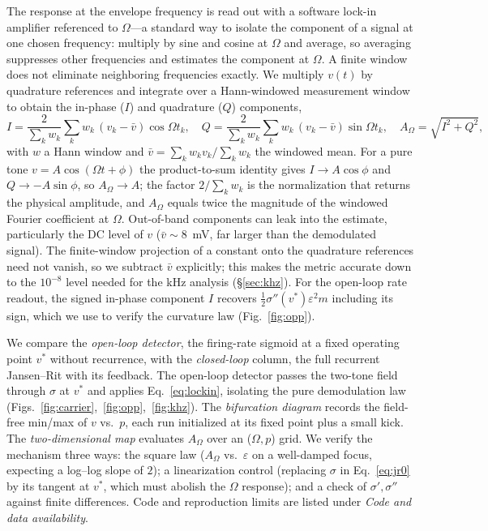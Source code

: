 \documentclass[11pt,a4paper]{article}
\newcommand{\Sig}{\sigma}
\newcommand{\half}{\tfrac{1}{2}}
\begin{document}
The response at the envelope frequency is read out with a software lock-in
amplifier referenced to $\Omega$---a standard way to isolate the component of a signal
at one chosen frequency: multiply by sine and cosine at $\Omega$ and average, so averaging suppresses other frequencies and estimates the component at
$\Omega$. A finite window does not eliminate neighboring frequencies exactly. We multiply $v(t)$ by quadrature references and
integrate over a Hann-windowed measurement window to obtain the in-phase ($I$) and
quadrature ($Q$) components,
\begin{equation}
I=\frac{2}{\sum_k w_k}\sum_k w_k\,(v_k-\bar v)\cos\Omega t_k,\quad
Q=\frac{2}{\sum_k w_k}\sum_k w_k\,(v_k-\bar v)\sin\Omega t_k,\quad
A_\Omega=\sqrt{I^2+Q^2},
\label{eq:lockin}
\end{equation}
with $w$ a Hann window and $\bar v=\sum_k w_k v_k/\sum_k w_k$ the windowed mean.
For a pure tone $v=A\cos(\Omega t+\phi)$ the product-to-sum identity gives
$I\to A\cos\phi$ and $Q\to -A\sin\phi$, so $A_\Omega\to A$; the factor
$2/\sum_k w_k$ is the normalization that returns the physical amplitude, and
$A_\Omega$ equals twice the magnitude of the windowed Fourier coefficient at
$\Omega$. Out-of-band components can leak into the estimate, particularly the DC level of $v$ ($\bar v\!\sim\!8$~mV, far
larger than the demodulated signal). The finite-window projection of a constant onto the quadrature references
need not vanish, so we subtract $\bar v$ explicitly; this makes the metric
accurate down to the $10^{-8}$ level needed for the kHz
analysis (\S\ref{sec:khz}). For the open-loop rate readout, the signed
in-phase component $I$ recovers
$\half\Sig''(v^*)\varepsilon^2 m$ including its sign, which we use to verify the
curvature law (Fig.~\ref{fig:opp}).

We compare the \emph{open-loop detector}, the firing-rate sigmoid at a fixed
operating point $v^*$ without recurrence, with the \emph{closed-loop} column, the full recurrent
Jansen--Rit with its feedback. The open-loop detector passes the two-tone field through
$\Sig$ at $v^*$ and applies Eq.~\eqref{eq:lockin}, isolating the pure demodulation law
(Figs.~\ref{fig:carrier},~\ref{fig:opp},~\ref{fig:khz}). The \emph{bifurcation
diagram} records the field-free min/max of $v$ vs.\ $p$, each run initialized at
its fixed point plus a small kick. The \emph{two-dimensional map} evaluates
$A_\Omega$ over an ($\Omega,p$) grid. We verify the mechanism three ways: the
square law ($A_\Omega$ vs.\ $\varepsilon$ on a well-damped focus, expecting a
log--log slope of $2$); a linearization control (replacing $\Sig$ in
Eq.~\eqref{eq:jr0} by its tangent at $v^*$, which must abolish the $\Omega$
response); and a check of $\Sig',\Sig''$ against finite differences. Code and reproduction limits are listed under \emph{Code and data availability}.
\end{document}
